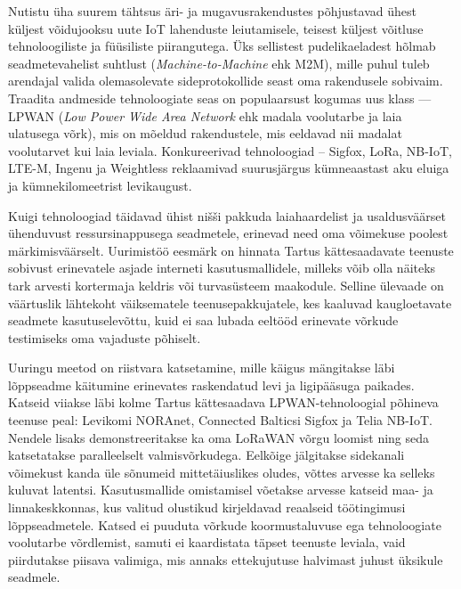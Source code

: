 \documentclass[12pt]{article}
\newcommand{\TODO}{\todo[inline]}
\begin{document}

Nutistu üha suurem tähtsus äri- ja mugavusrakendustes põhjustavad ühest küljest võidujooksu uute IoT lahenduste leiutamisele, teisest küljest võitluse tehnoloogiliste ja füüsiliste piirangutega.
Üks sellistest pudelikaeladest hõlmab seadmetevahelist suhtlust (\textit{Machine-to-Machine} ehk M2M), mille puhul tuleb arendajal valida olemasolevate sideprotokollide seast oma rakendusele sobivaim.
Traadita andmeside tehnoloogiate seas on populaarsust kogumas uus klass — LPWAN (\textit{Low Power Wide Area Network} ehk madala voolutarbe ja laia ulatusega võrk), mis on mõeldud rakendustele, mis eeldavad nii madalat voolutarvet kui laia leviala.
Konkureerivad tehnoloogiad -- Sigfox, LoRa, NB-IoT, LTE-M, Ingenu ja Weightless reklaamivad suurusjärgus kümneaastast aku eluiga ja kümnekilomeetrist levikaugust.

Kuigi tehnoloogiad täidavad ühist nišši  pakkuda laiahaardelist ja usaldusväärset ühenduvust ressursinappusega seadmetele, erinevad need oma võimekuse poolest märkimisväärselt.
Uurimistöö eesmärk on hinnata Tartus kättesaadavate teenuste sobivust erinevatele asjade interneti kasutusmallidele, milleks võib olla näiteks tark arvesti kortermaja keldris või turvasüsteem maakodule.
Selline ülevaade on väärtuslik lähtekoht väiksematele teenusepakkujatele, kes kaaluvad kaugloetavate seadmete kasutuselevõttu, kuid ei saa lubada eeltööd erinevate võrkude testimiseks oma vajaduste põhiselt.

Uuringu meetod on riistvara katsetamine, mille käigus mängitakse läbi lõppseadme käitumine erinevates raskendatud levi ja ligipääsuga paikades.
Katseid viiakse läbi kolme Tartus kättesaadava LPWAN-tehnoloogial põhineva teenuse peal: Levikomi NORAnet, Connected Balticsi Sigfox ja Telia NB-IoT.
Nendele lisaks demonstreeritakse ka oma LoRaWAN võrgu loomist ning seda katsetatakse paralleelselt valmisvõrkudega.
Eelkõige jälgitakse sidekanali võimekust kanda üle sõnumeid mittetäiuslikes oludes, võttes arvesse ka selleks kuluvat latentsi.
Kasutusmallide omistamisel võetakse arvesse katseid maa- ja linnakeskkonnas, kus valitud olustikud kirjeldavad reaalseid töötingimusi lõppseadmetele.
Katsed ei puuduta võrkude koormustaluvuse ega tehnoloogiate voolutarbe võrdlemist, samuti ei kaardistata täpset teenuste leviala, vaid piirdutakse piisava valimiga, mis annaks ettekujutuse halvimast juhust üksikule seadmele.
\end{document}
